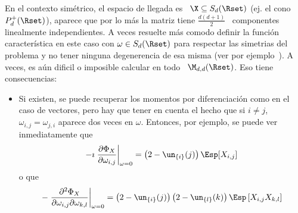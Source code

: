 En  el contexto  sim\'etrico,  \ie el  espacio  de llegada  es  \ $\X  \subseteq
S_d(\Rset)$ (ej.   el cono $P_d^+(\Rset)$), aparece  que por lo  m\'as la matriz
tiene  $\frac{d (d+1)}{2}$  \  componentes linealmente  independientes. A  veces
resuelte m\'as  comodo definir  la funci\'on caracter\'istica  en este  caso con
$\omega \in  S_d(\Rset)$ para  respectar las simetrias  del problema y  no tener
ninguna degenerencia  de esa misma (ver por  ejemplo~\cite{PedRic91, And03}).  A
veces, es a\'un  dificil o imposible calcular en  todo \ $\M_{d,d}(\Rset)$. Eso
tiene consecuencias:
%
\begin{itemize}
\item Si existen,  se puede recuperar los momentos  por diferenciaci\'on como en
  el caso de  vectores, pero hay que tener  en cuenta el hecho  que  si $i \ne
  j$, $\omega_{i,j} = \omega_{j,i}$ aparece dos veces en $\omega$. Entonces, por
  ejemplo, se puede ver inmediatamente que
  \[
  -\imath \left. \frac{\partial \Phi_X}{\partial \omega_{i,j}} \right|_{\omega =
    0} = \left( 2 - \un_{\{i\}}(j) \right) \Esp[X_{i,j}]
  \]
  o que
  \[
  - \left. \frac{\partial^2 \Phi_X}{\partial \omega_{i,j} \partial \omega_{k,l}}
  \right|_{\omega  =  0}  =  \left(  2  -  \un_{\{i\}}(j)  \right)  \left(  2  -
    \un_{\{l\}}(k) \right) \Esp\left[ X_{i,j} X_{k,l} \right]
  \]
\end{itemize}
